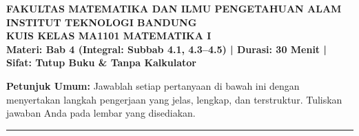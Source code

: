 \documentclass[11pt,a4paper]{article}
\begin{document}
\begin{center}
    {\large \textbf{FAKULTAS MATEMATIKA DAN ILMU PENGETAHUAN ALAM}}\\
    {\large \textbf{INSTITUT TEKNOLOGI BANDUNG}}\\[3pt]
    {\large \textbf{KUIS KELAS MA1101 MATEMATIKA I}}\\[2pt]
    \textbf{Materi: Bab 4 (Integral: Subbab 4.1, 4.3--4.5) \quad | \quad Durasi: 30 Menit \quad | \quad Sifat: Tutup Buku \& Tanpa Kalkulator}
\end{center}

\vspace{1pt}
\noindent{}

\vspace{6pt}
\noindent\textbf{Petunjuk Umum:} Jawablah setiap pertanyaan di bawah ini dengan menyertakan langkah pengerjaan yang jelas, lengkap, dan terstruktur. Tuliskan jawaban Anda pada lembar yang disediakan.

\vspace{6pt}
\hrule
\vspace{10pt}
\end{document}
